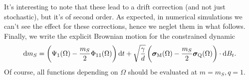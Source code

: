 It's interesting to note that these lead to a drift correction (and not just stochastic), but it's of second order. As expected, in numerical simulations we can't see the effect for these corrections, hence we neglet them in what follows.
Finally, we write the explicit Brownian motion for the constrained dynamic
\begin{equation} \label{2305:eq:constrained_brownian_motion_p1}
  \dif m_S = \left(\Psi_{1}{(\Omega)} - \frac{m_S}{2}\Phi_{11}{(\Omega)}\right)\dif t
            + \sqrt{\frac{\gamma}{d}}\left(\vec{\sigma}_\M{(\Omega)}-\frac{m_S}{2}\vec{\sigma}_\Q{(\Omega)}\right)\cdot \dif \b_t.
\end{equation}
Of course, all functions depending on \(\Omega\) should be evaluated at \(m=m_S, q=1\).

